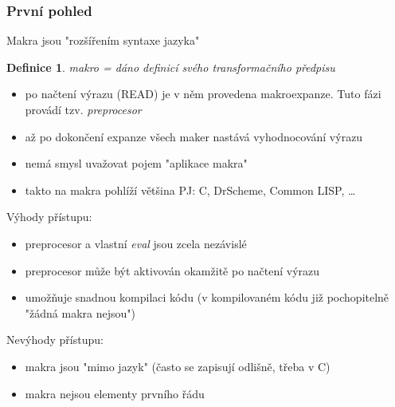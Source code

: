 \documentclass[10pt,a4paper]{article}
\newtheorem{definition}{Definice}
\begin{document}
\subsubsection{První pohled}
\begin{center}
	Makra jsou "rozšířením syntaxe jazyka"
\end{center}
\begin{definition}
	makro = dáno definicí svého transformačního předpisu
\end{definition}
\begin{itemize}
	\item po načtení výrazu (READ) je v něm provedena makroexpanze. Tuto fázi provádí tzv. \textit{preprocesor}
	\item až po dokončení expanze všech maker nastává vyhodnocování výrazu
	\item nemá smysl uvažovat pojem "aplikace makra"
	\item takto na makra pohlíží většina PJ: C, DrScheme, Common LISP, \dots
\end{itemize}
Výhody přístupu:
\begin{itemize}
	\item preprocesor a vlastní \textit{eval} jsou zcela nezávislé
	\item preprocesor může být aktivován okamžitě po načtení výrazu
	\item umožňuje snadnou kompilaci kódu (v kompilovaném kódu již pochopitelně "žádná makra nejsou")
\end{itemize}
Nevýhody přístupu:
\begin{itemize}
	\item makra jsou "mimo jazyk" (často se zapisují odlišně, třeba v C)
	\item makra nejsou elementy prvního řádu
\end{itemize}
\end{document}

